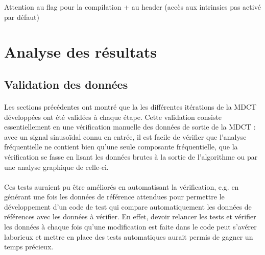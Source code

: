 \documentclass{article}
\begin{document}
    Attention au flag pour la compilation + au header (accès aux intrinsics pas activé par défaut)


    \newpage
    \section{Analyse des résultats}
    \subsection{Validation des données}
    \label{sec:validation}
    \paragraph{}
    Les sections précédentes ont montré que la les différentes itérations de la MDCT développées ont été validées à chaque étape. Cette validation consiste essentiellement en une vérification manuelle des données de sortie de la MDCT : avec un signal sinusoïdal connu en entrée, il est facile de vérifier que l'analyse fréquentielle ne contient bien qu'une seule composante fréquentielle, que la vérification se fasse en lisant les données brutes à la sortie de l'algorithme ou par une analyse graphique de celle-ci.

    \paragraph{}

    \paragraph{}
    Ces tests auraient pu être améliorés en automatisant la vérification, e.g. en générant une fois les données de référence attendues pour permettre le développement d'un code de test qui compare automatiquement les données de références avec les données à vérifier. En effet, devoir relancer les tests et vérifier les données à chaque fois qu'une modification est faite dans le code peut s'avérer laborieux et mettre en place des tests automatiques aurait permis de gagner un temps précieux.


\end{document}
